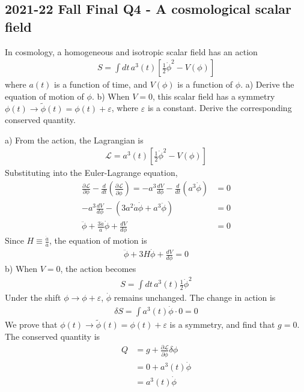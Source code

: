 \documentclass[12pt]{book} %
\numberwithin{equation}{chapter}
\def\d{\delta}
\def\e{\varepsilon}
\def\La{\mathcal{L}}
\def\p{\partial}
\begin{document}
\subsection*{2021-22 Fall Final Q4 - A cosmological scalar field}
In cosmology, a homogeneous and isotropic scalar field has an action
\begin{align*}
S=\int dt\,a^{3}(t)\left[\frac{1}{2}\dot{\phi}^{2}-V(\phi)\right]
\end{align*}
where $a(t)$ is a function of time, and $V(\phi)$ is a function of $\phi$.\bigskip\newline
a) Derive the equation of motion of $\phi$.\bigskip\newline
b) When $V=0$, this scalar field has a symmetry $\phi(t)\to \tilde{\phi}(t)=\phi(t)+\e$, where $\e$ is a constant. Derive the corresponding conserved quantity.

\begin{solbox}
a) From the action, the Lagrangian is
\begin{align*}
\La=a^{3}(t)\left[\frac{1}{2}\dot{\phi}^{2}-V(\phi)\right]
\end{align*}
Substituting into the Euler-Lagrange equation,
\begin{align*}
\frac{\p \La}{\p \phi}-\frac{d}{dt}\left(\frac{\p \La}{\p \dot{\phi}}\right)=-a^{3}\frac{dV}{d\phi}-\frac{d}{dt}\left(a^{3}\dot{\phi}\right)&=0\\
-a^{3}\frac{dV}{d\phi}-\left(3a^{2}\dot{a}\dot{\phi}+a^{3}\ddot{\phi}\right)&=0\\
\ddot{\phi}+\frac{3\dot{a}}{a}\dot{\phi}+\frac{dV}{d\phi}&=0
\end{align*}
Since $H\equiv\frac{\dot{a}}{a}$, the equation of motion is
\begin{align*}
\ddot{\phi}+3H\dot{\phi}+\frac{dV}{d\phi}=0
\end{align*}
b) When $V=0$, the action becomes
\begin{align*}
S=\int dt\,a^{3}(t)\frac{1}{2}\dot{\phi}^{2}
\end{align*}
Under the shift $\phi\to\phi+\e$, $\dot{\phi}$ remains unchanged. The change in action is
\begin{align*}
\d S=\int a^{3}(t)\dot{\phi}\cdot0=0
\end{align*}
We prove that $\phi(t)\to \tilde{\phi}(t)=\phi(t)+\e$ is a symmetry, and find that $g=0$. The conserved quantity is
\begin{align*}
Q&=g+\frac{\p \La}{\p \dot{\phi}}\d \phi\\
&=0+a^{3}(t)\dot{\phi}\\
&=a^{3}(t)\dot{\phi}
\end{align*}
\end{solbox}
\end{document}
